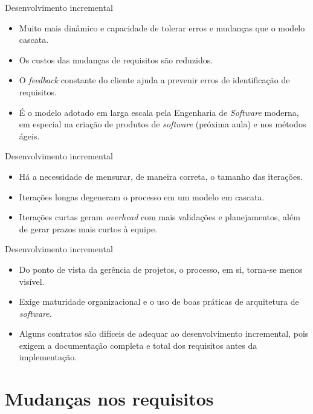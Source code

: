 \documentclass[11pt]{beamer}
\begin{document}
   \begin{frame}{Desenvolvimento incremental}
      \begin{itemize}
         \item Muito mais dinâmico e capacidade de tolerar erros e mudanças que o modelo cascata.
         \item Os custos das mudanças de requisitos são reduzidos.
         \item O \textit{feedback} constante do cliente ajuda a prevenir erros de identificação de requisitos.
         \item É o modelo adotado em larga escala pela Engenharia de \textit{Software} moderna, em especial na criação de produtos de \textit{software} (próxima aula) e nos métodos ágeis.
      \end{itemize}
   \end{frame}

   \begin{frame}{Desenvolvimento incremental}
      \begin{itemize}
         \item Há a necessidade de mensurar, de maneira correta, o tamanho das iterações.
         \item Iterações longas degeneram o processo em um modelo em cascata.
         \item Iterações curtas geram \textit{overhead} com mais validações e planejamentos, além de gerar prazos mais curtos à equipe.
      \end{itemize}
   \end{frame}

   \begin{frame}{Desenvolvimento incremental}
      \begin{itemize}
         \item Do ponto de vista da gerência de projetos, o processo, em si, torna-se menos visível.
         \item Exige maturidade organizacional e o uso de boas práticas de arquitetura de \textit{software}.
         \item Alguns contratos são difíceis de adequar ao desenvolvimento incremental, pois exigem a documentação completa e total dos requisitos antes da implementação.
      \end{itemize}
   \end{frame}

   \section*{Mudanças nos requisitos}
\end{document}
